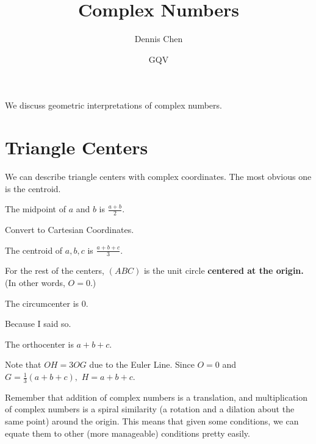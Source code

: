 \documentclass[mast]{lucky}
\title{Complex Numbers}
\author{Dennis Chen}
\date{GQV}
\begin{document}
\maketitle


We discuss geometric interpretations of complex numbers.

\section{Triangle Centers}
We can describe triangle centers with complex coordinates. The most obvious one is the centroid.

\begin{theo}[Midpoint]
The midpoint of $a$ and $b$ is $\frac{a+b}{2}.$
\end{theo}

\begin{pro}
Convert to Cartesian Coordinates.
\end{pro}

\begin{theo}[Centroid]
The centroid of $a,b,c$ is $\frac{a+b+c}{3}.$
\end{theo}

For the rest of the centers, $(ABC)$ is the unit circle \textbf{centered at the origin.} (In other words, $O=0.$)

\begin{theo}[Circumcenter]
The circumcenter is $0.$
\end{theo}

\begin{pro}
Because I said so.
\end{pro}

\begin{theo}[Orthocenter]
The orthocenter is $a+b+c.$
\end{theo}

\begin{pro}
Note that $OH=3OG$ due to the Euler Line. Since $O=0$ and $G=\frac{1}{3}(a+b+c),$ $H=a+b+c.$
\end{pro}

Remember that addition of complex numbers is a translation, and multiplication of complex numbers is a spiral similarity (a rotation and a dilation about the same point) around the origin. This means that given some conditions, we can equate them to other (more manageable) conditions pretty easily.
\end{document}
